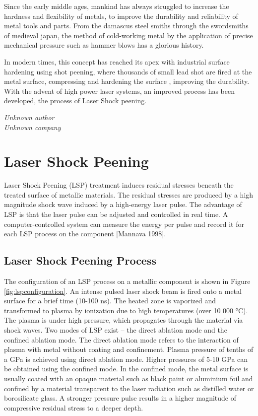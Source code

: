 \epigraph{Since the early middle ages, mankind has always struggled to increase the hardness and flexibility of metals, to improve the durability and reliability of  metal tools and parts. From the damascus steel smiths through the swordsmiths of medieval japan, the method of cold-working metal by the application of precise mechanical pressure such as hammer blows has a glorious history.

In modern times, this concept has reached its apex with industrial surface hardening using shot peening, where thousands of small lead shot are fired at the metal surface, compressing and hardening the surface , improving the durability. With the advent of high power laser systems, an improved process has been developed, the process of Laser Shock peening.}{\textit{Unknown author\\ Unknown company}}

\section{Laser Shock Peening}

Laser Shock Peening (LSP) treatment induces residual stresses beneath the treated surface of metallic materials. The residual stresses are produced by a high magnitude shock wave induced by a high-energy laser pulse. The advantage of LSP is that the laser pulse can be adjusted and controlled in real time. A computer-controlled system can measure the energy per pulse and record it for each LSP process on the component [Mannava 1998].

\subsection{Laser Shock Peening Process}
The configuration of an LSP process on a metallic component is shown in Figure \ref{fig:lspconfiguration}. An intense pulsed laser shock beam is fired onto a metal surface for a brief time (10-100 ns). The heated zone is vaporized and transformed to plasma by ionization due to high temperatures (over 10 000 °C). The plasma is under high pressure, which propagates through the material via shock waves. Two modes of LSP exist – the direct ablation mode and the confined ablation mode. The direct ablation mode refers to the interaction of plasma with metal without coating and confinement. Plasma pressure of tenths of a GPa is achieved using direct ablation mode. Higher pressures of 5-10 GPa can be obtained using the confined mode. In the confined mode, the metal surface is usually coated with an opaque material such as black paint or aluminium foil and confined by a material transparent to the laser radiation such as distilled water or borosilicate glass. A stronger pressure pulse results in a higher magnitude of compressive residual stress to a deeper depth.

